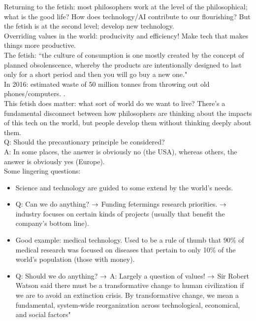 Returning to the fetish: most philosophers work at the level of the philosophical; what is the good life? How does technology/AI contribute to our flourishing? But the fetish is at the second level; develop new technology. \\

Overriding values in the world: producivity and efficiency! Make tech that makes things more productive. \\

The fetish: ``the culture of consumption is one mostly created by the concept of planned obsolenscence, whereby the products are intentionally designed to last only for a short period and then you will go buy a new one."\\

In 2016: estimated waste of 50 million tonnes from throwing out old phones/computers. . \\

This fetish does matter: what sort of world do we want to live? There's a fundamental disconnect between how philosophers are thinking about the impacts of this tech on the world, but people develop them without thinking deeply about them. \\

Q: Should the precautionary principle be considered? \\

A: In some places, the answer is obviously no (the USA), whereas others, the answer is obviously yes (Europe). \\

Some lingering questions:
\begin{itemize}
\item Science and technology are guided to some extend by the world's needs.
\item Q: Can we do anything?
$\rightarrow$ Funding fetermings research priorities.
$\rightarrow$ industry focuses on certain kinds of projects (usually that benefit the company's bottom line).
\item Good example: medical technology. Used to be a rule of thumb that 90\% of medical research was focused on diseases that pertain to only 10\% of the world's population (those with money).
\item Q: Should we do anything? 
$\rightarrow$ A: Largely a question of values!
$\rightarrow$ Sir Robert Watson said there must be a transformative change to human civilization if we are to avoid an extinction crisis. By transformative change, we mean a fundamental, system-wide reorganization across technological, economical, and social factors"
\end{itemize}

